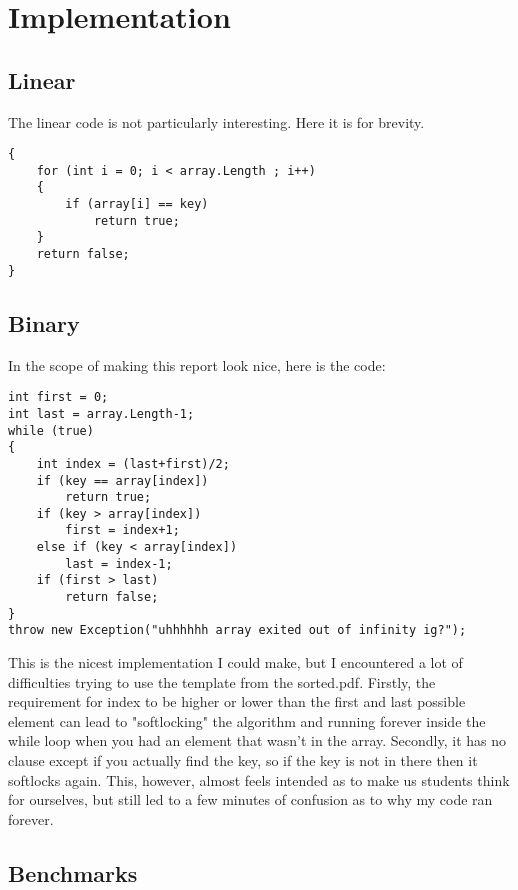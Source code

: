 \documentclass{article}
\begin{document}
\begin{lstlisting}

\end{lstlisting}

\section{Implementation}

\subsection{Linear}

The linear code is not particularly interesting. Here it is for brevity. 
\begin{lstlisting}
{
    for (int i = 0; i < array.Length ; i++)
    {
        if (array[i] == key)
            return true;
    }
    return false;
}
\end{lstlisting}
\subsection{Binary}

In the scope of making this report look nice, here is the code:
\begin{lstlisting}
int first = 0;
int last = array.Length-1;
while (true)
{
    int index = (last+first)/2;
    if (key == array[index])
        return true;
    if (key > array[index])
        first = index+1;
    else if (key < array[index])
        last = index-1;
    if (first > last)
        return false;
}
throw new Exception("uhhhhhh array exited out of infinity ig?");
\end{lstlisting}

This is the nicest implementation I could make, but I encountered a lot of difficulties trying to use the template from the sorted.pdf. 
Firstly, the requirement for index to be higher or lower than the first and last possible element can lead to "softlocking" the algorithm and running forever inside the while loop when you had an element that wasn't in the array.
Secondly, it has no clause except if you actually find the key, so if the key is not in there then it softlocks again. This, however, almost feels intended as to make us students think for ourselves, but still led to a few minutes of confusion as to why my code ran forever.


\subsection{Benchmarks}
\end{document}
